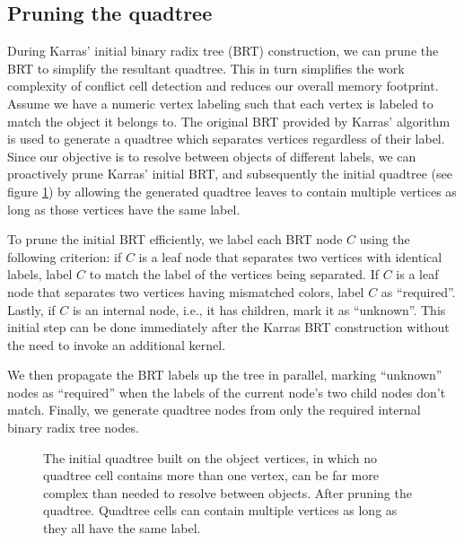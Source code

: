\documentclass[final,3p,times,twocolumn]{elsarticle}
\begin{document}
\subsection{Pruning the quadtree}
\label{sec:pruning}
During Karras' initial binary radix tree (BRT) construction, we can prune the BRT to simplify the resultant quadtree. This in turn simplifies the work complexity of conflict cell detection and reduces our overall memory footprint. Assume we have a numeric vertex labeling such that each vertex is labeled to match the object it belongs to. The original BRT provided by Karras' algorithm is used to generate a quadtree which separates vertices regardless of their label. Since our objective is to resolve between objects of different labels, we can proactively prune Karras' initial BRT, and subsequently the initial quadtree (see figure \ref{fig:pruning}) by allowing the generated quadtree leaves to contain multiple vertices as long as those vertices have the same label.

To prune the initial BRT efficiently, we label each BRT node $C$ using the following criterion: if $C$ is a leaf node that separates two vertices with identical labels, label $C$ to match the label of the vertices being separated. If $C$ is a leaf node that separates two vertices having mismatched colors, label $C$ as ``required''. Lastly, if $C$ is an internal node, i.e., it has children, mark it as ``unknown''. This initial step can be done immediately after the Karras BRT construction without the need to invoke an additional kernel.

We then propagate the BRT labels up the tree in parallel, marking ``unknown'' nodes as ``required'' when the labels of the current node's two child nodes don't match. Finally, we generate quadtree nodes from only the required internal binary radix tree nodes.

\begin{figure}
  \centering
  \caption{
    \protect{} The initial quadtree built on the object vertices, in which no quadtree cell contains more than one vertex, can be far more complex than needed to resolve between objects.
    \protect{} After pruning the quadtree. Quadtree cells can contain multiple vertices as long as they all have the same label.
  }
  \label{fig:pruning}
\end{figure}
\end{document}
